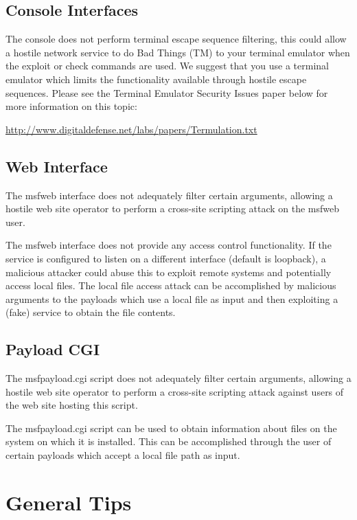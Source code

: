 \documentclass{report}
\begin{document}
	\section{Console Interfaces}
\par
The console does not perform terminal escape sequence filtering, this
could allow a hostile network service to do Bad Things (TM) to your terminal
emulator when the exploit or check commands are used. We suggest that you
use a terminal emulator which limits the functionality available through
hostile escape sequences. Please see the Terminal Emulator Security Issues paper
below for more information on this topic:

\url{http://www.digitaldefense.net/labs/papers/Termulation.txt}


	\section{Web Interface}
\par
The msfweb interface does not adequately filter certain arguments,
allowing a hostile web site operator to perform a cross-site scripting
attack on the msfweb user.

\par
The msfweb interface does not provide any access control functionality. If
the service is configured to listen on a different interface (default is
loopback), a malicious attacker could abuse this to exploit remote systems
and potentially access local files. The local file access attack can be
accomplished by malicious arguments to the payloads which use a local file
as input and then exploiting a (fake) service to obtain the file contents.
	
	
	\section{Payload CGI}
\par
The msfpayload.cgi script does not adequately filter certain arguments,
allowing a hostile web site operator to perform a cross-site scripting
attack against users of the web site hosting this script.

\par
The msfpayload.cgi script can be used to obtain information about files on
the system on which it is installed. This can be accomplished through the
user of certain payloads which accept a local file path as input.


\pagebreak
\chapter{General Tips}
\end{document}
